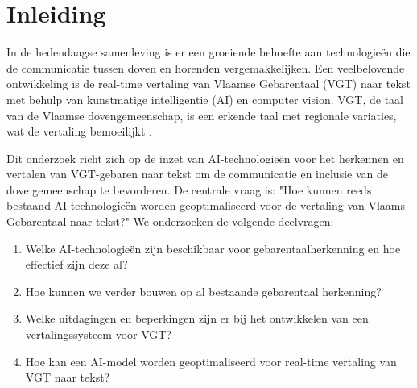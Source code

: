 


% 
\newcommand{\figref}[1]{(Zie \hyperref[#1]{figuur: \ref{#1}})}

\section{Inleiding}%
\label{sec:inleiding}

In de hedendaagse samenleving is er een groeiende behoefte aan technologieën die de communicatie tussen doven en horenden vergemakkelijken. Een veelbelovende ontwikkeling is de real-time vertaling van Vlaamse Gebarentaal (VGT) naar tekst met behulp van kunstmatige intelligentie (AI) en computer vision. VGT, de taal van de Vlaamse dovengemeenschap, is een erkende taal met regionale variaties, wat de vertaling bemoeilijkt \autocite{vanmeerbergen2000simultane}.

Dit onderzoek richt zich op de inzet van AI-technologieën voor het herkennen en vertalen van VGT-gebaren naar tekst om de communicatie en inclusie van de dove gemeenschap te bevorderen. De centrale vraag is: "Hoe kunnen reeds bestaand AI-technologieën worden geoptimaliseerd voor de vertaling van Vlaams Gebarentaal naar tekst?" We onderzoeken de volgende deelvragen:

\begin{enumerate} 
  \item Welke AI-technologieën zijn beschikbaar voor gebarentaalherkenning en hoe effectief zijn deze al? 
  \item Hoe kunnen we verder bouwen op al bestaande gebarentaal herkenning? 
  \item Welke uitdagingen en beperkingen zijn er bij het ontwikkelen van een vertalingssysteem voor VGT? 
  \item Hoe kan een AI-model worden geoptimaliseerd voor real-time vertaling van VGT naar tekst?
\end{enumerate}

